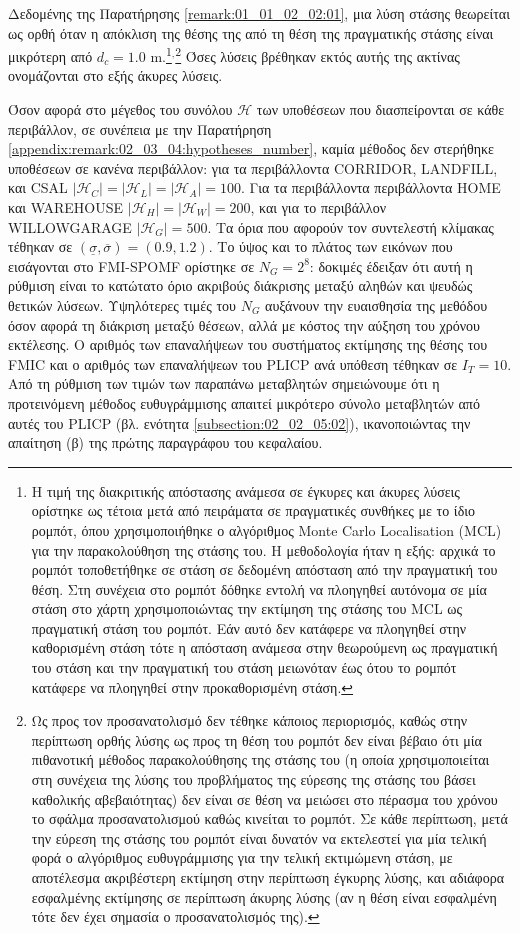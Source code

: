 Δεδομένης της Παρατήρησης \ref{remark:01_01_02_02:01}, μια λύση στάσης
θεωρείται ως ορθή όταν η απόκλιση της θέσης της από τη θέση της πραγματικής
στάσης είναι μικρότερη από $d_c = 1.0$ m.\footnote{Η τιμή της διακριτικής
απόστασης ανάμεσα σε έγκυρες και άκυρες λύσεις ορίστηκε ως τέτοια μετά από
πειράματα σε πραγματικές συνθήκες με το ίδιο ρομπότ, όπου χρησιμοποιήθηκε ο
αλγόριθμος Monte Carlo Localisation (MCL) για την παρακολούθηση της στάσης του.
Η μεθοδολογία ήταν η εξής: αρχικά το ρομπότ τοποθετήθηκε σε στάση σε δεδομένη
απόσταση από την πραγματική του θέση. Στη συνέχεια στο ρομπότ δόθηκε εντολή να
πλοηγηθεί αυτόνομα σε μία στάση στο χάρτη χρησιμοποιώντας την εκτίμηση της
στάσης του MCL ως πραγματική στάση του ρομπότ. Εάν αυτό δεν κατάφερε να
πλοηγηθεί στην καθορισμένη στάση τότε η απόσταση ανάμεσα στην θεωρούμενη ως
πραγματική του στάση και την πραγματική του στάση μειωνόταν έως ότου το ρομπότ
κατάφερε να πλοηγηθεί στην προκαθορισμένη στάση.}$^,$\footnote{Ως προς τον
προσανατολισμό δεν τέθηκε κάποιος περιορισμός, καθώς στην περίπτωση ορθής λύσης
ως προς τη θέση του ρομπότ δεν είναι βέβαιο ότι μία πιθανοτική μέθοδος
παρακολούθησης της στάσης του (η οποία χρησιμοποιείται στη συνέχεια της λύσης
του προβλήματος της εύρεσης της στάσης του βάσει καθολικής αβεβαιότητας) δεν
είναι σε θέση να μειώσει στο πέρασμα του χρόνου το σφάλμα προσανατολισμού καθώς
κινείται το ρομπότ. Σε κάθε περίπτωση, μετά την εύρεση της στάσης του ρομπότ
είναι δυνατόν να εκτελεστεί για μία τελική φορά ο αλγόριθμος ευθυγράμμισης για
την τελική εκτιμώμενη στάση, με αποτέλεσμα ακριβέστερη εκτίμηση στην περίπτωση
έγκυρης λύσης, και αδιάφορα εσφαλμένης εκτίμησης σε περίπτωση άκυρης λύσης (αν
η θέση είναι εσφαλμένη τότε δεν έχει σημασία ο προσανατολισμός της).} Όσες
λύσεις βρέθηκαν εκτός αυτής της ακτίνας ονομάζονται στο εξής άκυρες λύσεις.

Όσον αφορά στο μέγεθος του συνόλου $\mathcal{H}$ των υποθέσεων που
διασπείρονται σε κάθε περιβάλλον, σε συνέπεια με την Παρατήρηση
\ref{appendix:remark:02_03_04:hypotheses_number}, καμία μέθοδος δεν στερήθηκε
υποθέσεων σε κανένα περιβάλλον: για τα περιβάλλοντα CORRIDOR, LANDFILL, και
CSAL $|\mathcal{H}_C| = |\mathcal{H}_L| = |\mathcal{H}_A| = 100$. Για τα
περιβάλλοντα περιβάλλοντα HOME και WAREHOUSE $|\mathcal{H}_H| = |\mathcal{H}_W|
= 200$, και για το περιβάλλον WILLOWGARAGE $|\mathcal{H}_G| = 500$.  Τα όρια
που αφορούν τον συντελεστή κλίμακας τέθηκαν σε $(\underline{\sigma},
\overline{\sigma}) = (0.9, 1.2)$. Το ύψος και το πλάτος των εικόνων που
εισάγονται στο FMI-SPOMF ορίστηκε σε $N_G = 2^8$: δοκιμές έδειξαν ότι αυτή η
ρύθμιση είναι το κατώτατο όριο ακριβούς διάκρισης μεταξύ αληθών και ψευδώς
θετικών λύσεων. Υψηλότερες τιμές του $N_G$ αυξάνουν την ευαισθησία της μεθόδου
όσον αφορά τη διάκριση μεταξύ θέσεων, αλλά με κόστος την αύξηση του χρόνου
εκτέλεσης. Ο αριθμός των επαναλήψεων του συστήματος εκτίμησης της θέσης του
FMIC και ο αριθμός των επαναλήψεων του PLICP ανά υπόθεση τέθηκαν σε $I_T = 10$.
Από τη ρύθμιση των τιμών των παραπάνω μεταβλητών σημειώνουμε ότι η προτεινόμενη
μέθοδος ευθυγράμμισης απαιτεί μικρότερο σύνολο μεταβλητών από αυτές του
PLICP (βλ. ενότητα \ref{subsection:02_02_05:02}), ικανοποιώντας την απαίτηση
(β) της πρώτης παραγράφου του κεφαλαίου.

